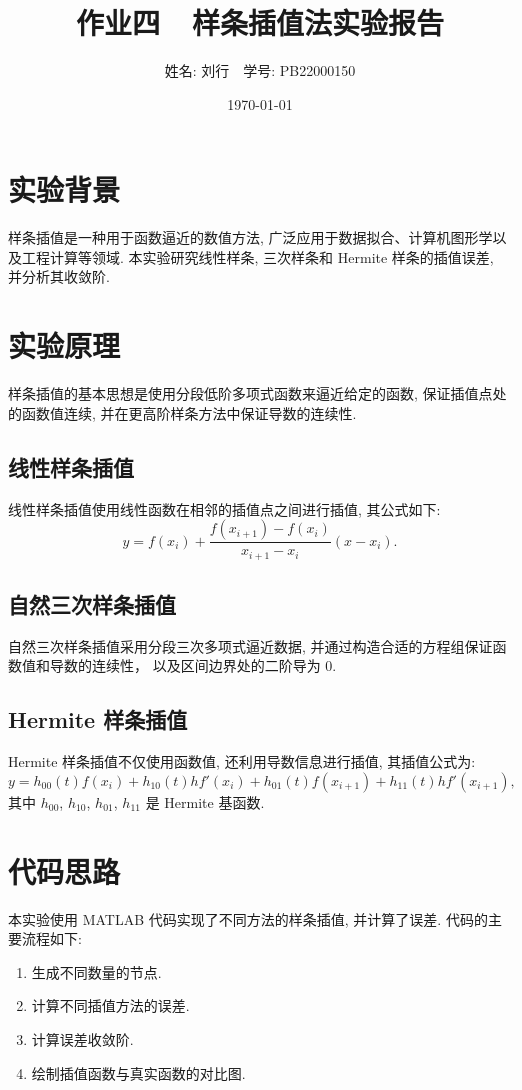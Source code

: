\documentclass[12pt]{article}
\title{作业四~~样条插值法实验报告}
\author{姓名: 刘行~~学号: PB22000150}
\date{\today}
\begin{document}
\maketitle

\section{实验背景}
	样条插值是一种用于函数逼近的数值方法, 广泛应用于数据拟合、计算机图形学以及工程计算等领域. 本实验研究线性样条, 三次样条和 Hermite 样条的插值误差, 并分析其收敛阶.

\section{实验原理}
	样条插值的基本思想是使用分段低阶多项式函数来逼近给定的函数, 保证插值点处的函数值连续, 并在更高阶样条方法中保证导数的连续性.

\subsection{线性样条插值}
	线性样条插值使用线性函数在相邻的插值点之间进行插值, 其公式如下:
	\begin{equation}
		y = f(x_i) + \frac{f(x_{i+1}) - f(x_i)}{x_{i+1} - x_i} (x - x_i).
	\end{equation}

\subsection{自然三次样条插值}
	自然三次样条插值采用分段三次多项式逼近数据, 并通过构造合适的方程组保证函数值和导数的连续性，  以及区间边界处的二阶导为 $0$.

\subsection{Hermite 样条插值}
	Hermite 样条插值不仅使用函数值, 还利用导数信息进行插值, 其插值公式为:
	\begin{equation}
		y = h_{00}(t) f(x_i) + h_{10}(t) h f'(x_i) + h_{01}(t) f(x_{i+1}) + h_{11}(t) h f'(x_{i+1}),
	\end{equation}
	其中 $h_{00}$, $h_{10}$, $h_{01}$, $h_{11}$ 是 Hermite 基函数.

\section{代码思路}
	本实验使用 MATLAB 代码实现了不同方法的样条插值, 并计算了误差. 代码的主要流程如下:
	\begin{enumerate}
		\item 生成不同数量的节点.
		\item 计算不同插值方法的误差.
		\item 计算误差收敛阶.
		\item 绘制插值函数与真实函数的对比图.
	\end{enumerate}
\end{document}
